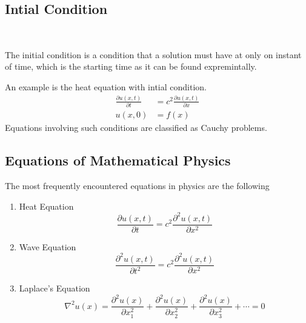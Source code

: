 \documentclass[]{article}
\begin{document}
\subsection{Intial Condition}
\
\begin{definition}
    The initial condition is a condition that a solution must have at only on instant of time, which is the starting time as it can be found expremintally.
\end{definition}
An example is the heat equation with intial condition.
\begin{align*}
\frac{\partial u(x,t)}{\partial t}  &= c^2 \frac{\partial u(x,t)}{\partial x}
\\
u(x,0) &= f(x)
\end{align*}
Equations involving such conditions are classified as Cauchy problems.
\subsection{Equations of Mathematical Physics}
The most frequently encountered equations in physics are the following
\begin{enumerate}
\item Heat Equation
\[
    \frac{\partial u(x,t)}{\partial t} = c^2 \frac{\partial^2 u(x,t)}{\partial x^2}    
\]
\item Wave Equation 
\[
    \frac{\partial^2 u(x,t)}{\partial t^2} = c^2 \frac{\partial^2 u(x,t)}{\partial x^2}    
\]
\item Laplace's Equation
\[
    \nabla^2 u(x) = \frac{\partial^2 u(x)}{\partial x^{2}_{1}} + \frac{\partial^2 u(x)}{\partial x^{2}_{2}} + \frac{\partial^2 u(x)}{\partial x^{2}_{3}} + \cdots = 0    
\]
\end{enumerate}

\newpage
\end{document}
